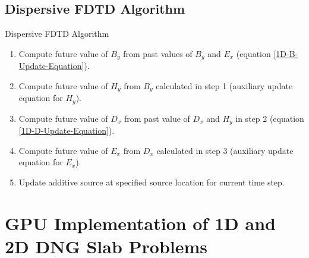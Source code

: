 \documentclass{beamer}
\begin{document}
\subsection{Dispersive FDTD Algorithm}
\begin{frame}{Dispersive FDTD Algorithm}
\begin{enumerate}
\item Compute future value of $B_y$ from past values of $B_y$ and $E_x$ (equation \ref{1D-B-Update-Equation}).
\item Compute future value of $H_y$ from $B_y$ calculated in step 1 (auxiliary update equation for $H_y$).
\item Compute future value of $D_x$ from past value of $D_x$ and $H_y$ in step 2 (equation \ref{1D-D-Update-Equation}).
\item Compute future value of $E_x$ from $D_x$ calculated in step 3 (auxiliary update equation for $E_x$).
\item Update additive source at specified source location for current time step.
\end{enumerate}
\end{frame}
\section{GPU Implementation of 1D and 2D DNG Slab Problems}
\end{document}
